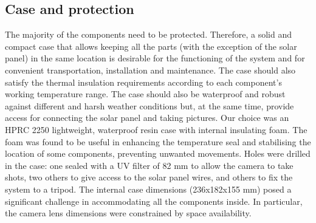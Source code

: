 \subsection{Case and protection}\label{Case and protection}
The majority of the components need to be protected. Therefore, a solid and compact case
that allows keeping all the parts (with the exception of the solar panel) in the same
location is desirable for the functioning of the system and for convenient
transportation, installation and maintenance. The case should also satisfy the thermal
insulation requirements according to each component's working temperature range. The case
should also be waterproof and robust against different and harsh weather conditions but,
at the same time, provide access for connecting the solar panel and taking pictures. Our
choice was an HPRC 2250 lightweight, waterproof resin case with internal insulating foam.
The foam was found to be useful in enhancing the temperature seal and stabilising the
location of some components, preventing unwanted movements. Holes were drilled in the
case: one sealed with a UV filter of 82 mm to allow the camera to take shots, two others
to give access to the solar panel wires, and others to fix the system to a tripod. The
internal case dimensions (236x182x155 mm) posed a significant challenge in accommodating
all the components inside. In particular, the camera lens dimensions were constrained by
space availability.

